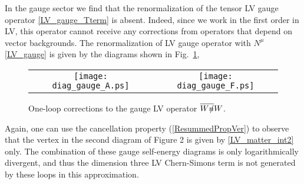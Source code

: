 \documentclass[12pt]{revtex4}
\newcommand{\slashed}[1]{\hbox{{$#1$}\llap{$/$}}}
\begin{document}
In the gauge sector we find that the renormalization of the tensor LV
gauge operator \eqref{LV_gauge_Tterm} is absent. 
Indeed, since we work in the first order in
LV, this operator cannot receive any corrections from operators that
depend on vector backgrounds. The renormalization of LV
gauge operator with $N^\mu$ \eqref{LV_gauge} is given by the diagrams shown in
Fig.~\ref{diag_LV_gauge},
\begin{figure}[h]
\begin{center}
\begin{tabular}{cc}
\texttt{[image: diag\_gauge\_A.ps]}
&
\texttt{[image: diag\_gauge\_F.ps]}
\end{tabular}
\end{center}
\caption{\label{diag_LV_gauge}
        One-loop corrections to the gauge LV operator 
        $ \overline{W\slashed{n}} W $.
}
\end{figure}
Again, one can use the cancellation property (\ref{ResummedPropVer}) 
to observe that the vertex in the second diagram of Figure 2 is given by \eqref{LV_matter_int2} only. 
The combination of these gauge self-energy diagrams is
only logarithmically divergent, and thus the dimension three LV Chern-Simons
term is not generated by these loops in this approximation.  
\end{document}
